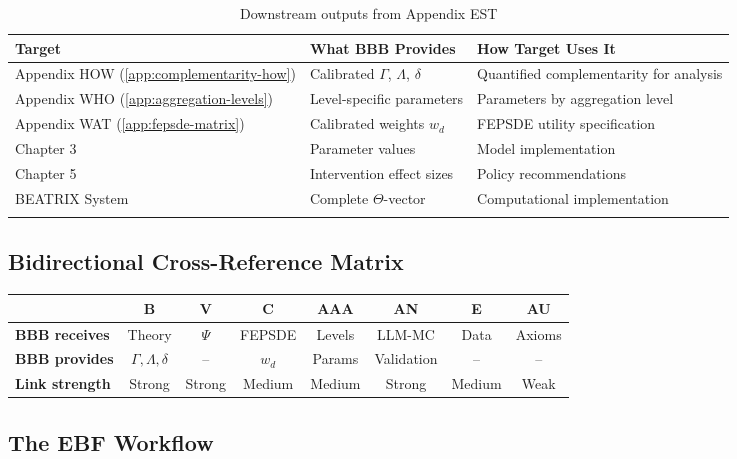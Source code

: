 \documentclass[11pt,a4paper]{article}
\theoremstyle{definition}
\begin{document}
\begin{longtable}{lp{4cm}p{6cm}}
\toprule
\textbf{Target} & \textbf{What BBB Provides} & \textbf{How Target Uses It} \\
\midrule
\endfirsthead
Appendix HOW (\ref{app:complementarity-how}) & Calibrated $\Gamma$, $\Lambda$, $\delta$ & Quantified complementarity for analysis \\
Appendix WHO (\ref{app:aggregation-levels}) & Level-specific parameters & Parameters by aggregation level \\
Appendix WAT (\ref{app:fepsde-matrix}) & Calibrated weights $w_d$ & FEPSDE utility specification \\
Chapter 3 & Parameter values & Model implementation \\
Chapter 5 & Intervention effect sizes & Policy recommendations \\
BEATRIX System & Complete $\Theta$-vector & Computational implementation \\
\bottomrule
\caption{Downstream outputs from Appendix EST}
\end{longtable}

\subsection{Bidirectional Cross-Reference Matrix}

\begin{center}
\small
\begin{tabular}{l|ccccccc}
\toprule
& \textbf{B} & \textbf{V} & \textbf{C} & \textbf{AAA} & \textbf{AN} & \textbf{E} & \textbf{AU} \\
\midrule
\textbf{BBB receives} & Theory & $\Psi$ & FEPSDE & Levels & LLM-MC & Data & Axioms \\
\textbf{BBB provides} & $\Gamma,\Lambda,\delta$ & -- & $w_d$ & Params & Validation & -- & -- \\
\midrule
\textbf{Link strength} & Strong & Strong & Medium & Medium & Strong & Medium & Weak \\
\bottomrule
\end{tabular}
\end{center}

\subsection{The EBF Workflow}

\begin{center}
\end{center}
\end{document}
